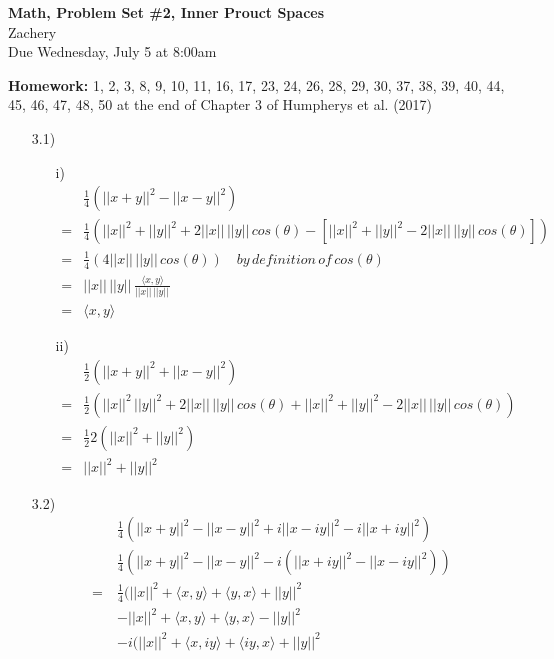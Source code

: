 \documentclass[letterpaper,12pt]{article}
\theoremstyle{definition}
\begin{document}
\begin{flushleft}
   \textbf{\large{Math, Problem Set \#2, Inner Prouct Spaces}} \\[5pt] Zachery \\[5pt]
   Due Wednesday, July 5 at 8:00am
\end{flushleft}
\textbf{Homework:} 1, 2, 3, 8, 9, 10, 11, 16, 17, 23, 24, 26, 28, 29, 30, 37, 38, 39, 40, 44, 45, 46,
47, 48, 50 at the end of Chapter 3 of Humpherys et al. (2017)
\begin{enumerate}
\item[3.1)] 
\begin{itemize}
\item[i)]
\begin{align*}
&\frac{1}{4} \left( ||x+y||^2 - ||x-y||^2 \right) \\
=&\frac{1}{4} \left(||x||^2  +||y||^2 + 2||x||\,||y||\,cos(\theta) - [||x||^2  +||y||^2 - 2||x||\,||y|| \, cos(\theta) ] \right) \\
=& \frac{1}{4} \left( 4 ||x||\, ||y|| \, cos(\theta) \right) \quad by \,  definition \, of \, cos(\theta)\\
=&||x||\, ||y|| \, \frac{\langle x,y\rangle}{||x||\, ||y|| \,} \\
=& \langle x ,y\rangle
\end{align*}
\item[ii)] 
\begin{align*}
&\frac{1}{2} \left( ||x+y||^2 + ||x-y||^2 \right) \\
=& \frac{1}{2} \left( ||x||^2 \, ||y||^2 + 2||x||\,||y||\,cos(\theta)  +    ||x||^2  +||y||^2 - 2||x||\,||y|| \, cos(\theta) \right) \\
=& \frac{1}{2} 2 \left( ||x||^2+||y||^2  \right) \\
=& ||x||^2+||y||^2 
\end{align*}
\end{itemize}
\item[3.2)]
\begin{align*}
&\frac{1}{4} \left( ||x+y||^2 - ||x-y||^2  + i||x-iy||^2 - i||x+iy||^2 \right) \\
&\frac{1}{4} \left( ||x+y||^2 - ||x-y||^2  - i(||x+iy||^2 - ||x-iy||^2  )\right) \\
=& \frac{1}{4} ( ||x||^2 +\langle x, y \rangle +\langle  y ,x
\rangle +||y||^2 \\ 
\quad & - ||x||^2 +\langle x, y \rangle +\langle  y ,x\rangle -||y||^2 \\
\quad &-i( ||x||^2 +\langle x, iy \rangle +\langle  iy ,x
\rangle +||y||^2 \\ 

\end{align*}
\end{enumerate}
\end{document}
